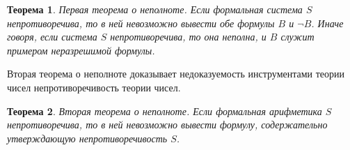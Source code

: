 \documentclass[specialist,
               substylefile = spbu.rtx,
               subf,href,colorlinks=true, 12pt]{disser}
\newtheorem{theorem}{Теорема}
\begin{document}
\begin{theorem}
Первая теорема о неполноте. Если формальная система $S$ непротиворечива, то в ней невозможно вывести обе формулы $B$ и $\neg B$. Иначе говоря, если система $S$ непротиворечива, то она неполна, и $B$ служит примером неразрешимой формулы.
\end{theorem}

Вторая теорема о неполноте доказывает недоказуемость инструментами теории чисел непротиворечивость теории чисел. 

\begin{theorem}
Вторая теорема о неполноте. Если формальная арифметика $S$ непротиворечива, то в ней невозможно вывести формулу, содержательно утверждающую непротиворечивость $S$.
\end{theorem}




\end{document}

